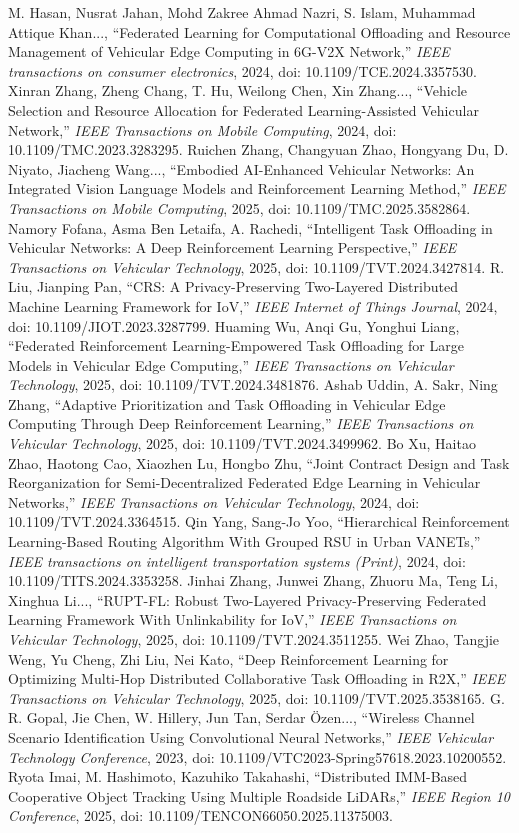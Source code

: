 M. Hasan, Nusrat Jahan, Mohd Zakree Ahmad Nazri, S. Islam, Muhammad Attique Khan..., ``Federated Learning for Computational Offloading and Resource Management of Vehicular Edge Computing in 6G-V2X Network,'' \textit{IEEE transactions on consumer electronics}, 2024, doi: 10.1109/TCE.2024.3357530.
Xinran Zhang, Zheng Chang, T. Hu, Weilong Chen, Xin Zhang..., ``Vehicle Selection and Resource Allocation for Federated Learning-Assisted Vehicular Network,'' \textit{IEEE Transactions on Mobile Computing}, 2024, doi: 10.1109/TMC.2023.3283295.
Ruichen Zhang, Changyuan Zhao, Hongyang Du, D. Niyato, Jiacheng Wang..., ``Embodied AI-Enhanced Vehicular Networks: An Integrated Vision Language Models and Reinforcement Learning Method,'' \textit{IEEE Transactions on Mobile Computing}, 2025, doi: 10.1109/TMC.2025.3582864.
Namory Fofana, Asma Ben Letaifa, A. Rachedi, ``Intelligent Task Offloading in Vehicular Networks: A Deep Reinforcement Learning Perspective,'' \textit{IEEE Transactions on Vehicular Technology}, 2025, doi: 10.1109/TVT.2024.3427814.
R. Liu, Jianping Pan, ``CRS: A Privacy-Preserving Two-Layered Distributed Machine Learning Framework for IoV,'' \textit{IEEE Internet of Things Journal}, 2024, doi: 10.1109/JIOT.2023.3287799.
Huaming Wu, Anqi Gu, Yonghui Liang, ``Federated Reinforcement Learning-Empowered Task Offloading for Large Models in Vehicular Edge Computing,'' \textit{IEEE Transactions on Vehicular Technology}, 2025, doi: 10.1109/TVT.2024.3481876.
Ashab Uddin, A. Sakr, Ning Zhang, ``Adaptive Prioritization and Task Offloading in Vehicular Edge Computing Through Deep Reinforcement Learning,'' \textit{IEEE Transactions on Vehicular Technology}, 2025, doi: 10.1109/TVT.2024.3499962.
Bo Xu, Haitao Zhao, Haotong Cao, Xiaozhen Lu, Hongbo Zhu, ``Joint Contract Design and Task Reorganization for Semi-Decentralized Federated Edge Learning in Vehicular Networks,'' \textit{IEEE Transactions on Vehicular Technology}, 2024, doi: 10.1109/TVT.2024.3364515.
Qin Yang, Sang-Jo Yoo, ``Hierarchical Reinforcement Learning-Based Routing Algorithm With Grouped RSU in Urban VANETs,'' \textit{IEEE transactions on intelligent transportation systems (Print)}, 2024, doi: 10.1109/TITS.2024.3353258.
Jinhai Zhang, Junwei Zhang, Zhuoru Ma, Teng Li, Xinghua Li..., ``RUPT-FL: Robust Two-Layered Privacy-Preserving Federated Learning Framework With Unlinkability for IoV,'' \textit{IEEE Transactions on Vehicular Technology}, 2025, doi: 10.1109/TVT.2024.3511255.
Wei Zhao, Tangjie Weng, Yu Cheng, Zhi Liu, Nei Kato, ``Deep Reinforcement Learning for Optimizing Multi-Hop Distributed Collaborative Task Offloading in R2X,'' \textit{IEEE Transactions on Vehicular Technology}, 2025, doi: 10.1109/TVT.2025.3538165.
G. R. Gopal, Jie Chen, W. Hillery, Jun Tan, Serdar Özen..., ``Wireless Channel Scenario Identification Using Convolutional Neural Networks,'' \textit{IEEE Vehicular Technology Conference}, 2023, doi: 10.1109/VTC2023-Spring57618.2023.10200552.
Ryota Imai, M. Hashimoto, Kazuhiko Takahashi, ``Distributed IMM-Based Cooperative Object Tracking Using Multiple Roadside LiDARs,'' \textit{IEEE Region 10 Conference}, 2025, doi: 10.1109/TENCON66050.2025.11375003.